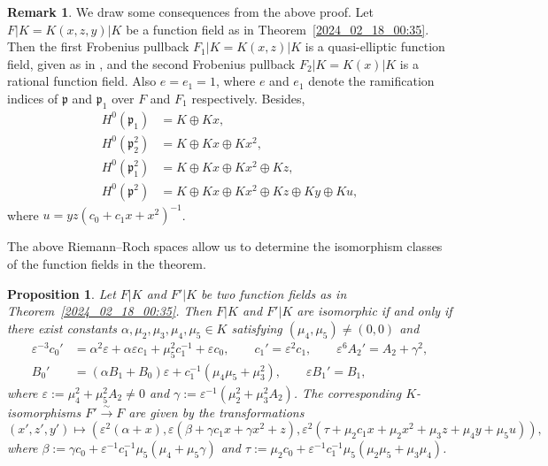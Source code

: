 \documentclass[12pt,reqno]{amsart}
\newcommand{\todoo}[2][]{\todo[size=tiny, #1]{#2}} %
\newtheorem{prop}[thm]{Proposition}
\theoremstyle{definition}
\newtheorem{rem}[thm]{Remark}
\newcommand{\pp}{\mathfrak{p}}
\newcommand{\al}{\alpha}
\newcommand{\be}{\beta}
\newcommand{\te}{\theta}
\newcommand{\ga}{\gamma}
\newcommand{\eps}{\varepsilon}
\begin{document}
\begin{rem}\label{2024_08_26_14:35}
We draw some consequences from the above proof.
Let $F|K=K(x,z,y)|K$ be a function field as in Theorem~\ref{2024_02_18_00:35}.
Then the first Frobenius pullback $F_1|K=K(x,z)|K$ is a quasi-elliptic function field,
given as in \cite[Theorem~2.1~(i)]{HiSt23}, and the second Frobenius pullback $F_2|K=K(x)|K$ is a rational function field.
Also $e=e_1=1$, where $e$ and $e_1$ denote the ramification indices of $\pp$ and $\pp_1$ over $F$ and $F_1$ respectively. Besides,
\begin{align*}
    H^0(\pp_1) &= K \oplus Kx, \\
    H^0(\pp_2^2) &=  K \oplus Kx \oplus Kx^2, \\
    H^0(\pp_1^2) &= K \oplus Kx \oplus Kx^2 \oplus Kz, \\
    H^0(\pp^2) &= K\oplus Kx\oplus Kx^2 \oplus Kz \oplus Ky \oplus Ku,
\end{align*}
where $u = yz (c_0 + c_1 x + x^2)^{-1}$.
\end{rem}

The above Riemann--Roch spaces allow us to determine the isomorphism classes of the function fields in the theorem.

\begin{prop}\label{2024_03_25_19:55}
Let $F|K$ and $F'|K$ be two function fields as in Theorem~\ref{2024_02_18_00:35}. 
Then $F|K$ and $F'|K$ are isomorphic if and only if there exist constants $\al,\mu_2,\mu_3,\mu_4,\mu_5 \in K$ satisfying $(\mu_4,\mu_5)\neq (0,0)$ and
\begin{align*}
    \eps^{-3} c_0' &= \al^2 \eps + \al \eps c_1 + \mu_5^2 c_1^{-1} + \eps c_0, \qquad c_1' = \eps^2 c_1, \qquad \eps^6 A_2' = A_2 + \ga^2, \\
    B_0' &= (\al B_1 + B_0) \eps + c_1^{-1} (\mu_4 \mu_5 + \mu_3^2), \qquad \eps B_1' = B_1, 
\end{align*}
where $\eps:= \mu_4^2 + \mu_5^2 A_2 \neq 0$ and $\ga := \eps^{-1}(\mu_2^2 + \mu_3^2 A_2)$.
The corresponding $K$-isomorphisms $F'\overset\sim\to F$ are given by the transformations
\[ (x',z',y') \mapsto (\eps^2(\al + x),\eps(\be + \ga c_1 x + \ga x^2 + z),\eps^2(\tau + \mu_2 c_1 x + \mu_2 x^2 + \mu_3 z + \mu_4 y + \mu_5 u)), \]
where $\be:= \ga c_0 + \eps^{-1} c_1^{-1} \mu_5 (\mu_4 + \mu_5 \ga)$ and $\tau := \mu_2 c_0 + \eps^{-1} c_1^{-1} \mu_5 (\mu_2 \mu_5 + \mu_3 \mu_4)$.
\end{prop}
\end{document}
